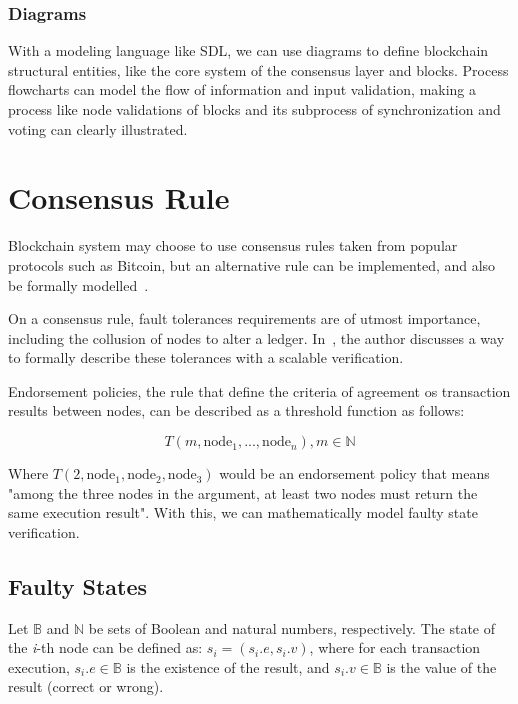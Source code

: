\documentclass[sigconf, nonacm]{acmart}
\begin{document}
  \subsubsection{Diagrams}
  With a modeling language like SDL, we can use diagrams to define blockchain structural entities, like the core system of the consensus layer
  and blocks. Process flowcharts can model the flow of information and input validation, making a process like
  node validations of blocks and its subprocess of synchronization and voting can clearly illustrated.

\section{Consensus Rule}\label{consensusRule}
Blockchain system may choose to use consensus rules taken from popular protocols such as Bitcoin,
but an alternative rule can be implemented, and also be formally modelled~\cite{Kawahara2020}.

On a consensus rule, fault tolerances requirements are of utmost importance, including the collusion of nodes to alter a ledger.
In~\cite{Kawahara2020}, the author discusses a way to formally describe these tolerances with a scalable verification.

Endorsement policies, the rule that define the criteria of agreement os transaction results between nodes, can be described
as a threshold function as follows:

\begin{displaymath}
  T(m,\textrm{node}_1,... ,\textrm{node}_n), m \in \mathbb{N}
\end{displaymath}
\linebreak[1]

Where $T(2,\textrm{node}_1,\textrm{node}_2,\textrm{node}_3)$ would be an endorsement policy
that means "among the three nodes in the argument, at least two nodes must return the same execution result".
With this, we can mathematically model faulty state verification.

\subsection{Faulty States}
Let $\mathbb{B}$ and $\mathbb{N}$ be sets of Boolean and natural numbers, respectively. The state of the \textit{i}-th node can be defined as:
$s_i = (s_i.e,s_i.v)$, where for each transaction execution, $s_i.e \in \mathbb{B}$ is the  existence of the result,
and $s_i.v \in \mathbb{B}$ is the value of the result (correct or wrong).
\end{document}
